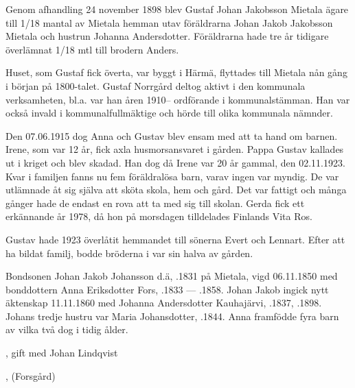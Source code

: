 Genom afhandling 24 november 1898 blev Gustaf Johan Jakobsson Mietala ägare till 1/18 mantal av Mietala hemman utav föräldrarna Johan Jakob Jakobsson Mietala och hustrun Johanna Andersdotter. Föräldrarna hade tre år tidigare överlämnat 1/18 mtl till brodern Anders.

Huset, som Gustaf fick överta, var byggt i Härmä, flyttades till Mietala nån gång i början på 1800-talet. Gustaf Norrgård deltog aktivt i den kommunala verksamheten, bl.a. var han åren 1910-- ordförande i kommunalstämman. Han var också invald i kommunalfullmäktige och hörde till olika kommunala nämnder.

Den 07.06.1915 dog Anna och Gustav blev ensam med att ta hand om barnen. Irene, som var 12 år, fick axla husmorsansvaret i gården. Pappa Gustav kallades ut i kriget och blev skadad. Han dog då Irene var 20 år gammal, den 02.11.1923. Kvar i familjen fanns nu fem föräldralösa barn, varav ingen var myndig. De var utlämnade åt sig själva att sköta skola, hem och gård. Det var fattigt och många gånger hade de endast en rova att ta med sig till skolan. Gerda fick ett erkännande år 1978, då hon på morsdagen tilldelades Finlands Vita Ros.

Gustav hade 1923 överlåtit hemmandet till sönerna Evert och Lennart. Efter att ha bildat familj, bodde bröderna i var sin halva av gården.


%
Bondsonen Johan Jakob Johansson d.ä, .1831 på Mietala, vigd 06.11.1850 med bonddottern Anna Eriksdotter Fors, .1833 --- .1858. Johan Jakob ingick nytt äktenskap 11.11.1860 med Johanna Andersdotter Kauhajärvi, .1837, .1898. Johans tredje hustru var Maria Johansdotter,  .1844.
Anna framfödde fyra barn av vilka två dog i tidig ålder.
\begin{jhchildren}
  \item {}, gift med Johan Lindqvist
  \item {}, (Forsgård)
  \item {}
  \item {}
\end{jhchildren}

